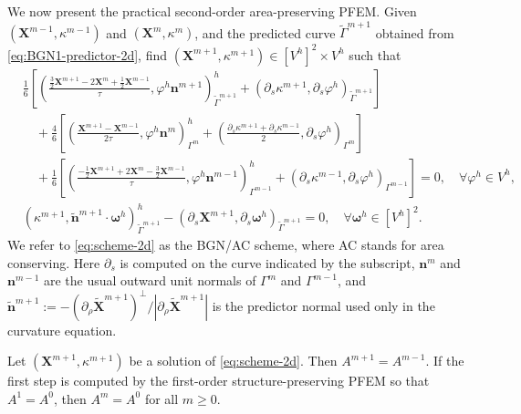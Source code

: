 \documentclass[smallextended]{svjour3}
\numberwithin{equation}{section}
\begin{document}
	We now present the practical second-order area-preserving PFEM. Given $(\mathbf{X}^{m-1},\kappa^{m-1})$ and $(\mathbf{X}^{m},\kappa^{m})$, and the predicted curve $\widetilde{\Gamma}^{m+1}$ obtained from \eqref{eq:BGN1-predictor-2d}, find $(\mathbf{X}^{m+1},\kappa^{m+1})\in[V^h]^2\times V^h$ such that
	\begin{subequations}
		\label{eq:scheme-2d}
		\begin{align}
			&
			\frac16\left[
			\left(
			\frac{\frac32\mathbf{X}^{m+1}-2\mathbf{X}^{m}+\frac12\mathbf{X}^{m-1}}{\tau},
			\varphi^h\mathbf{n}^{m+1}
			\right)^h_{\widetilde{\Gamma}^{m+1}}
			+
			\left(
			\partial_s\kappa^{m+1},
			\partial_s\varphi^h
			\right)_{\widetilde{\Gamma}^{m+1}}
			\right]
			\nonumber\\
			&\quad
			+\frac46\left[
			\left(
			\frac{\mathbf{X}^{m+1}-\mathbf{X}^{m-1}}{2\tau},
			\varphi^h\mathbf{n}^{m}
			\right)^h_{\Gamma^{m}}
			+
			\left(
			\frac{\partial_s\kappa^{m+1}+\partial_s\kappa^{m-1}}{2},
			\partial_s\varphi^h
			\right)_{\Gamma^{m}}
			\right]
			\nonumber\\
			&\quad
			+\frac16\left[
			\left(
			\frac{-\frac12\mathbf{X}^{m+1}+2\mathbf{X}^{m}-\frac32\mathbf{X}^{m-1}}{\tau},
			\varphi^h\mathbf{n}^{m-1}
			\right)^h_{\Gamma^{m-1}}
			+
			\left(
			\partial_s\kappa^{m-1},
			\partial_s\varphi^h
			\right)_{\Gamma^{m-1}}
			\right]
			=0,
			\quad \forall \varphi^h\in V^h,
			\label{eq:scheme-2d-a}
			\\
			&
			\left(
			\kappa^{m+1},
			\widetilde{\mathbf{n}}^{m+1}\cdot\boldsymbol{\omega}^h
			\right)^h_{\widetilde{\Gamma}^{m+1}}
			-
			\left(
			\partial_s\mathbf{X}^{m+1},
			\partial_s\boldsymbol{\omega}^h
			\right)_{\widetilde{\Gamma}^{m+1}}
			=0,
			\quad
			\forall \boldsymbol{\omega}^h\in[V^h]^2.
			\label{eq:scheme-2d-b}
		\end{align}
	\end{subequations}
	We refer to \eqref{eq:scheme-2d} as the BGN/AC scheme, where AC stands for area conserving. Here $\partial_s$ is computed on the curve indicated by the subscript, $\mathbf{n}^{m}$ and $\mathbf{n}^{m-1}$ are the usual outward unit normals of $\Gamma^m$ and $\Gamma^{m-1}$, and $\widetilde{\mathbf{n}}^{m+1}:=-(\partial_\rho\widetilde{\mathbf{X}}^{m+1})^\perp/|\partial_\rho\widetilde{\mathbf{X}}^{m+1}|$ is the predictor normal used only in the curvature equation.
	
	\begin{theorem}
		\label{thm:area-conservation-2d}
		Let $(\mathbf{X}^{m+1},\kappa^{m+1})$ be a solution of \eqref{eq:scheme-2d}. Then $A^{m+1}=A^{m-1}$. If the first step is computed by the first-order structure-preserving PFEM so that $A^1=A^0$, then $A^m=A^0$ for all $m\ge 0$.
	\end{theorem}
	
\end{document}
